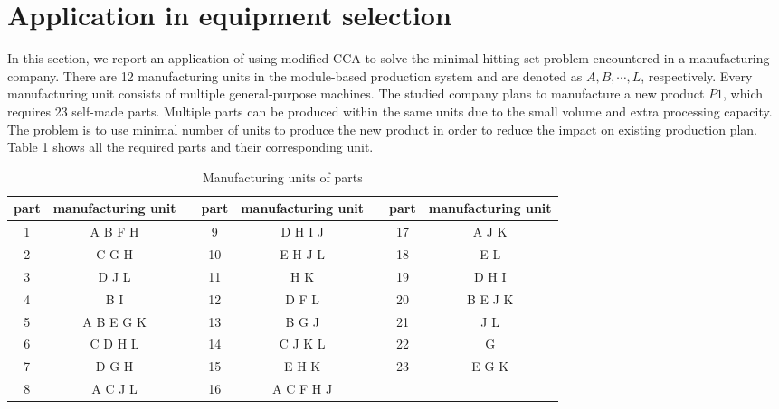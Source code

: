 \section{Application in equipment selection}
In this section, we report an application of using modified CCA to solve the minimal hitting set problem encountered in a manufacturing company.
There are 12 manufacturing units in the module-based production system and are denoted as $A, B, \cdots, L$, respectively.
Every manufacturing unit consists of multiple general-purpose machines.
The studied company plans to manufacture a new product $P1$, which requires 23 self-made parts.
Multiple parts can be produced within the same units due to the small volume and extra processing capacity.
The problem is to use minimal number of units to produce the new product in order to reduce the impact on existing production plan.
Table \ref{tab:tab4} shows all the required parts and their corresponding unit.


\begin{table}[h!]
	\begin{center}
		\caption{Manufacturing units of parts}
		\label{tab:tab4}
		\begin{tabular}{cc|c|cc|c|cc}
			\hline
			part & manufacturing unit && part & manufacturing unit && part & manufacturing unit \\
			\hline
			1 & A B F H   && 9  & D H I J   && 17 & A J K \\
			2 & C G H     && 10 & E H J L   && 18 & E L \\
			3 & D J L     && 11 & H K       && 19 & D H I \\
			4 & B I       && 12 & D F L     && 20 & B E J K \\
			5 & A B E G K && 13 & B G J     && 21 & J L \\
			6 & C D H L   && 14 & C J K L   && 22 & G \\
			7 & D G H     && 15 & E H K     && 23 & E G K \\
			8 & A C J L   && 16 & A C F H J &&    & \\
			\hline
		\end{tabular}
	\end{center}
\end{table}



